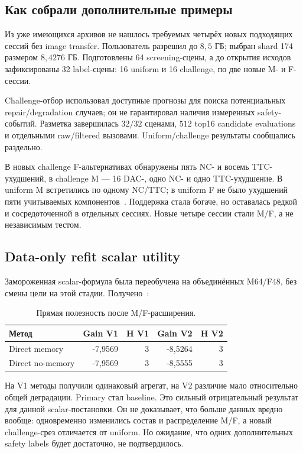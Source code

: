 \documentclass[11pt,a4paper]{article}
\begin{document}
\subsection{Как собрали дополнительные примеры}
Из уже имеющихся архивов не нашлось требуемых четырёх новых подходящих сессий без image transfer. Пользователь разрешил до $8{,}5$ ГБ; выбран shard 174 размером $8{,}4276$ ГБ. Подготовлены 64 screening-сцены, а до открытия исходов зафиксированы 32 label-сцены: 16 uniform и 16 challenge, по две новые M- и F-сессии.

Challenge-отбор использовал доступные прогнозы для поиска потенциальных repair/degradation случаев; он не гарантировал наличия измеренных safety-событий. Разметка завершилась $32/32$ сценами, $512$ top16 candidate evaluations и отдельными raw/filtered вызовами. Uniform/challenge результаты сообщались раздельно.

В новых challenge F-альтернативах обнаружены пять NC- и восемь TTC-ухудшений, в challenge M --- 16 DAC-, одно NC- и одно TTC-ухудшение. В uniform M встретились по одному NC/TTC; в uniform F не было ухудшений пяти учитываемых компонентов~\cite{newmf}. Поддержка стала богаче, но оставалась редкой и сосредоточенной в отдельных сессиях. Новые четыре сессии стали M/F, а не независимым тестом.

\subsection{Data-only refit scalar utility}
Замороженная scalar-формула была переобучена на объединённых M64/F48, без смены цели на этой стадии. Получено~\cite{expanded}:
\par
\begin{table}[htbp]\centering\small
\caption{Прямая полезность после M/F-расширения.}
\begin{tabular}{@{}lrrrr@{}}\toprule
Метод & Gain V1 & H V1 & Gain V2 & H V2\\\midrule
Direct memory & -7,9569 & 3 & -8,5264 & 3\\
Direct no-memory & -7,9569 & 3 & -8,5555 & 3\\\bottomrule
\end{tabular}
\end{table}
\par
На V1 методы получили одинаковый агрегат, на V2 различие мало относительно общей деградации. Primary стал baseline. Это сильный отрицательный результат для данной scalar-постановки. Он не доказывает, что больше данных вредно вообще: одновременно изменились состав и распределение M/F, а новый challenge-срез отличается от uniform. Но ожидание, что одних дополнительных safety labels будет достаточно, не подтвердилось.
\end{document}
